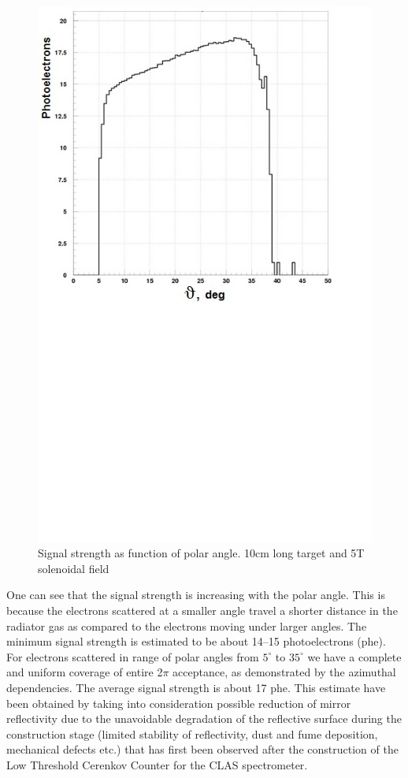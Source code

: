 \begin{figure}[!h]
    \centering
    \includegraphics[width=1.0\linewidth,trim={0.0cm 9.4cm 0.0cm 0.0cm},clip]{images/10cm_Targ_5T_Field_Theta.jpg}
    \caption{Signal strength as function of polar angle. 10cm long target and 5T solenoidal field}
    \label{fig:10cm_Targ_5T_Field_Theta}
\end{figure}

One can see that the signal strength is increasing with the polar angle. This is because the electrons scattered at a smaller angle travel a shorter distance in the radiator gas as compared to the electrons moving under larger angles. The minimum signal strength is estimated to be about 14–15 photoelectrons (phe). For electrons scattered in range of polar angles from $5^\circ$ to $35^\circ$
we have a complete and uniform coverage of entire 2$\pi$ acceptance, as demonstrated by the azimuthal dependencies. The average signal strength is about 17 phe. This estimate have been obtained by taking into consideration possible reduction of mirror reflectivity due to the unavoidable degradation of the reflective surface during the construction stage (limited stability of reflectivity, dust and fume deposition, mechanical defects etc.) that has first been observed after the construction of the Low Threshold Cerenkov Counter for the CLAS spectrometer.

